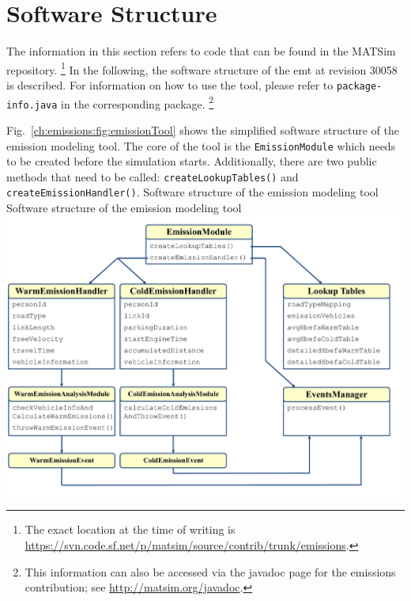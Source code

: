{\section{Software Structure}
\label{ch:emissions:structure}
The information in this section refers to code that can be found in the 
MATSim repository.%
%
\footnote{
%
The exact location at the time of writing is 
\url{https://svn.code.sf.net/p/matsim/source/contrib/trunk/emissions}.
%
}
In the following, the software structure of the \gls{emt} at 
revision 30058 is described. For information on how to use the tool, please 
refer to \lstinline|package-info.java| in the corresponding package.%
%
\footnote{
%
This information can also be accessed via the javadoc page for the emissions contribution; see \url{http://matsim.org/javadoc}.
%
}
%

Fig.~\ref{ch:emissions:fig:emissionTool} shows the simplified software structure of the emission modeling tool. The core of the tool is the \lstinline|EmissionModule| which needs to be created before the simulation starts. Additionally, there are two public methods that need to be called: \lstinline|createLookupTables()| and \lstinline|createEmissionHandler()|.
%
\createfigure%
{Software structure of the emission modeling tool}%
{Software structure of the emission modeling tool}%
{\label{ch:emissions:fig:emissionTool}}%
{\includegraphics[width=0.99\textwidth, angle=0]{extending/figures/emissionToolOverview_pdfa.pdf}}%
{}

}
